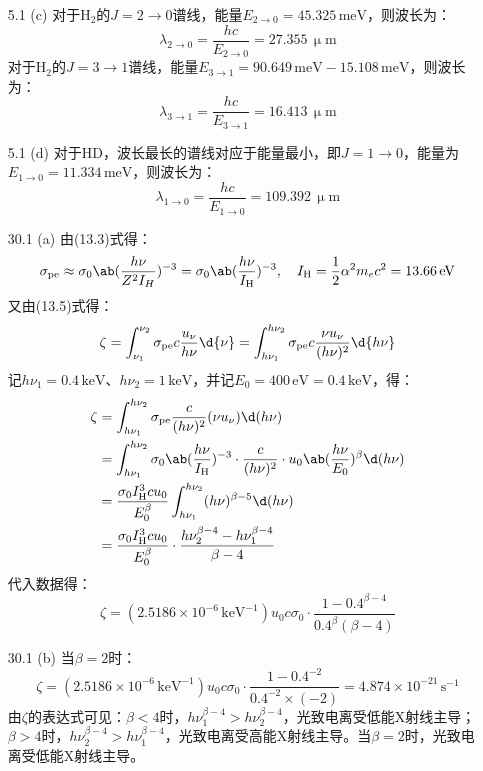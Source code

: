\documentclass[a4paper,fontset=none]{ctexart}
\newcommand{\um}{\upmu\mathrm{m}}
\begin{document}
\begin{enumerate}
    \medskip
    \item[5.1 (c)]
    对于$\mathrm{H_2}$的$J = 2 \to 0$谱线，能量$E_{2 \to 0} = 45.325\,\mathrm{meV}$，则波长为：
    \[
        \lambda_{2 \to 0} = \frac{hc}{E_{2 \to 0}} = 27.355\,\um
    \]
    对于$\mathrm{H_2}$的$J = 3 \to 1$谱线，能量$E_{3 \to 1} = 90.649\,\mathrm{meV} - 15.108\,\mathrm{meV}$，则波长为：
    \[
        \lambda_{3 \to 1} = \frac{hc}{E_{3 \to 1}} = 16.413\,\um
    \]

    \medskip
    \item[5.1 (d)]
    对于$\mathrm{HD}$，波长最长的谱线对应于能量最小，即$J = 1 \to 0$，能量为$E_{1 \to 0} = 11.334\,\mathrm{meV}$，则波长为：
    \[
        \lambda_{1 \to 0} = \frac{hc}{E_{1 \to 0}} = 109.392\,\um
    \]

    \bigskip
    \item[30.1 (a)]
    由(13.3)式得：
    \[
        \sigma_{\mathrm{pe}} \approx \sigma_0 \ab(\frac{h\nu}{Z^2 I_H})^{-3} = \sigma_0 \ab(\frac{h\nu}{I_{\mathrm{H}}})^{-3},\quad I_{\mathrm{H}} = \frac{1}{2}\alpha^2 m_e c^2 = 13.66\,\mathrm{eV}
    \]
    又由(13.5)式得：
    \[
        \zeta = \int_{\nu_1}^{\nu_2} \sigma_{\mathrm{pe}} c \frac{u_\nu}{h\nu} \d{\nu} = \int_{h\nu_1}^{h\nu_2} \sigma_{\mathrm{pe}} c \frac{\nu u_\nu}{(h\nu)^2} \d{h\nu}
    \]
    记$h\nu_1 = 0.4\,\mathrm{keV}$、$h\nu_2 = 1\,\mathrm{keV}$，并记$E_0 = 400\,\mathrm{eV} = 0.4\,\mathrm{keV}$，得：
    \begin{align*}
        \zeta
        &= \int_{h\nu_1}^{h\nu_2} \sigma_{\mathrm{pe}} \frac{c}{(h\nu)^2} (\nu u_\nu) \d(h\nu) \\
        &= \int_{h\nu_1}^{h\nu_2} \sigma_0 \ab(\frac{h\nu}{I_{\mathrm{H}}})^{-3} \cdot \frac{c}{(h\nu)^2} \cdot u_0 \ab(\frac{h\nu}{E_0})^\beta \d(h\nu) \\
        &= \frac{\sigma_0 I_{\mathrm{H}}^3 cu_0}{E_0^\beta} \int_{h\nu_1}^{h\nu_2} (h\nu)^{\beta-5} \d(h\nu) \\
        &= \frac{\sigma_0 I_{\mathrm{H}}^3 cu_0}{E_0^\beta} \cdot \frac{h\nu_2^{\beta-4} - h\nu_1^{\beta-4}}{\beta - 4}
    \end{align*}
    代入数据得：
    \[
        \zeta = (2.5186 \times 10^{-6}\,\mathrm{keV^{-1}})u_0 c\sigma_0 \cdot \frac{1 - 0.4^{\beta - 4}}{0.4^\beta (\beta - 4)}
    \]

    \medskip
    \item[30.1 (b)]
    当$\beta = 2$时：
    \[
        \zeta = (2.5186 \times 10^{-6}\,\mathrm{keV^{-1}})u_0 c\sigma_0 \cdot \frac{1 - 0.4^{-2}}{0.4^{-2} \times (-2)} = 4.874 \times 10^{-21}\,\mathrm{s^{-1}}
    \]
    由$\zeta$的表达式可见：$\beta < 4$时，$h\nu_1^{\beta-4} > h\nu_2^{\beta-4}$，光致电离受低能X射线主导；$\beta > 4$时，$h\nu_2^{\beta-4} > h\nu_1^{\beta-4}$，光致电离受高能X射线主导。当$\beta = 2$时，光致电离受低能X射线主导。


\end{enumerate}
\end{document}
